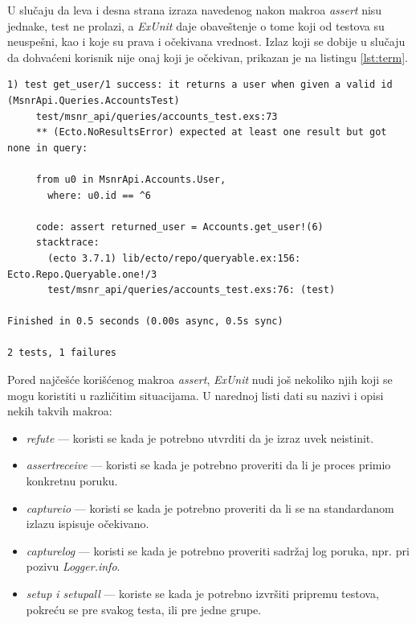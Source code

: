 \documentclass[12pt,oneside]{memoir}
\begin{document}
\par U slučaju da leva i desna strana izraza navedenog nakon makroa \emph{assert} nisu jednake, test ne prolazi, a \emph{ExUnit} daje obaveštenje o tome koji od testova su neuspešni, kao i koje su prava i očekivana vrednost. Izlaz koji se dobije u slučaju da dohvaćeni korisnik nije onaj koji je očekivan, prikazan je na listingu \ref{lst:term}. 

\begin{lstlisting}[style=DOS, caption={Izlaz u slučaju testa koji ne prolazi},captionpos=b, label={lst:term}]
1) test get_user/1 success: it returns a user when given a valid id (MsnrApi.Queries.AccountsTest)
     test/msnr_api/queries/accounts_test.exs:73
     ** (Ecto.NoResultsError) expected at least one result but got none in query:

     from u0 in MsnrApi.Accounts.User,
       where: u0.id == ^6

     code: assert returned_user = Accounts.get_user!(6)
     stacktrace:
       (ecto 3.7.1) lib/ecto/repo/queryable.ex:156: Ecto.Repo.Queryable.one!/3
       test/msnr_api/queries/accounts_test.exs:76: (test)

Finished in 0.5 seconds (0.00s async, 0.5s sync)

2 tests, 1 failures
\end{lstlisting}


\par Pored najčešće korišćenog makroa \emph{assert}, \emph{ExUnit} nudi još nekoliko njih koji se mogu koristiti u različitim situacijama. U narednoj listi dati su nazivi i opisi nekih takvih makroa:
 \begin{itemize}
 \item \emph{refute} --- koristi se kada je potrebno utvrditi da je izraz uvek neistinit. 
 \item \emph{assert{\textunderscore}receive} --- koristi se kada je potrebno proveriti da li je proces primio konkretnu poruku.
 \item \emph {capture{\textunderscore}io} --- koristi se kada je potrebno proveriti da li se na standardanom izlazu ispisuje očekivano.
 \item \emph{capture{\textunderscore}log} --- koristi se kada je potrebno proveriti sadržaj log poruka, npr. pri pozivu \emph{Logger.info}.
 \item \emph{setup i setup{\textunderscore}all} --- koriste se kada je potrebno izvršiti pripremu testova, pokreću se pre svakog testa, ili pre jedne grupe.
 \end{itemize}
 
\end{document}
